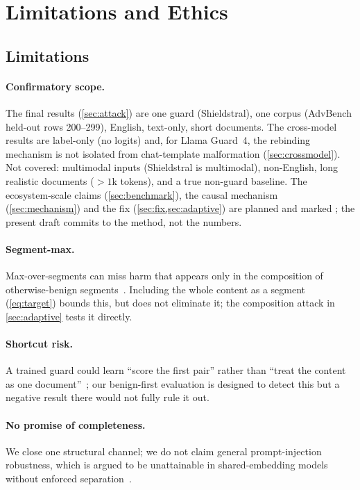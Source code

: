 \section{Limitations and Ethics}
\label{sec:limitations}

\subsection{Limitations}

\paragraph{Confirmatory scope.}
The final results (\cref{sec:attack}) are one guard (Shieldstral), one corpus (AdvBench held-out rows 200--299), English, text-only, short documents.
The cross-model results are label-only (no logits) and, for Llama Guard~4, the rebinding mechanism is not isolated from chat-template malformation (\cref{sec:crossmodel}).
Not covered: multimodal inputs (Shieldstral is multimodal), non-English, long realistic documents ($>1$k tokens), and a true non-guard baseline. %
The ecosystem-scale claims (\cref{sec:benchmark}), the causal mechanism (\cref{sec:mechanism}) and the fix (\cref{sec:fix,sec:adaptive}) are planned and marked \tbd{}; the present draft commits to the method, not the numbers.

\paragraph{Segment-max.}
Max-over-segments can miss harm that appears only in the composition of otherwise-benign segments~\citep{zhou2026prompt}.
Including the whole content as a segment (\cref{eq:target}) bounds this, but does not eliminate it; the composition attack in \cref{sec:adaptive} tests it directly.

\paragraph{Shortcut risk.}
A trained guard could learn ``score the first pair'' rather than ``treat the content as one document''~\citep{wang2025illusion}; our benign-first evaluation is designed to detect this but a negative result there would not fully rule it out.

\paragraph{No promise of completeness.}
We close one structural channel; we do not claim general prompt-injection robustness, which is argued to be unattainable in shared-embedding models without enforced separation~\citep{pant2026inseparability}.

